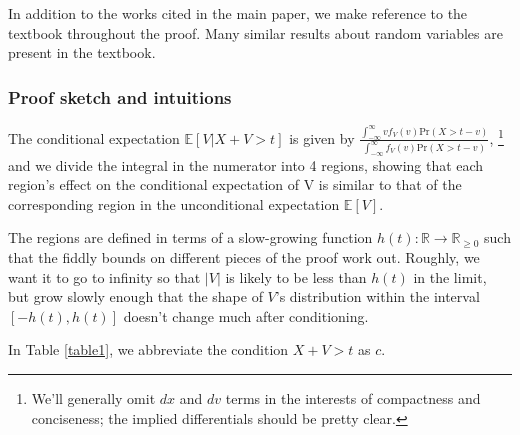 \documentclass[../main.tex]{subfiles}
\begin{document}
In addition to the works cited in the main paper, we make reference to the textbook \citep{foss2013introduction} throughout the proof. Many similar results about random variables are present in the textbook.

\subsubsection{Proof sketch and intuitions}

 The conditional expectation \(\mathbb E[V | X + V > t]\) is given by \(\frac{\int_{-\infty}^\infty vf_V(v)\text{Pr}(X>t-v)} {\int_{-\infty}^\infty f_V(v)\text{Pr}(X>t-v)}\), \footnote{We'll generally omit \(dx\) and \(dv\) terms in the interests of compactness and conciseness; the implied differentials should be pretty clear.}
 and we divide the integral in the numerator into 4 regions, showing that each region's effect on the conditional expectation of V is similar to that of the corresponding region in the unconditional expectation \(\mathbb E[V]\).

The regions are defined in terms of a slow-growing function \(h(t):\mathbb R \to \mathbb R_{\ge 0}\) such that the fiddly bounds on different pieces of the proof work out. Roughly, we want it to go to infinity so that \(|V|\) is likely to be less than \(h(t)\) in the limit, but grow slowly enough that the shape of \(V\)'s distribution within the interval \([-h(t),h(t)]\) doesn't change much after conditioning.

In Table \ref{table1}, we abbreviate the condition \(X+V>t\) as \(c\).
\end{document}
